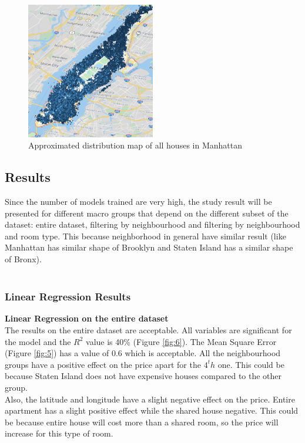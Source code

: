 \documentclass{FR16}
\begin{document}
\begin{figure}[H]
\centering
\includegraphics[width=0.5\textwidth]{figures/figure4.PNG} 
\caption{\label{fig:4}  Approximated distribution map of all houses in Manhattan }
\end{figure}






\newpage


\subsection{Results}

Since the number of models trained are very high, the study result will be presented for different macro groups that depend on the different subset of the dataset: entire dataset,  filtering by neighbourhood  and filtering by neighbourhood  and room type. This because neighborhood in general have similar result (like Manhattan has similar shape of Brooklyn and Staten Island has a similar shape of Bronx).\\\\


\subsubsection{Linear Regression Results}

\textbf{Linear Regression on the entire dataset}\\
\noindent The results on the entire dataset are acceptable. All variables are significant for the model and the $R^2$ value is 40\% (Figure \ref{fig:6}).
The Mean Square Error (Figure \ref{fig:5}) has a value of 0.6 which is acceptable. All the neighbourhood groups have a positive effect on the price apart for the $4^th$ one. This could be because Staten Island does not have expensive houses compared to the other group. \\
Also, the latitude and longitude have a slight negative effect on the price. Entire apartment has a slight positive effect while the shared house negative. This could be because entire house will cost more than a shared room, so the price will increase for this type of room. 
\end{document}
